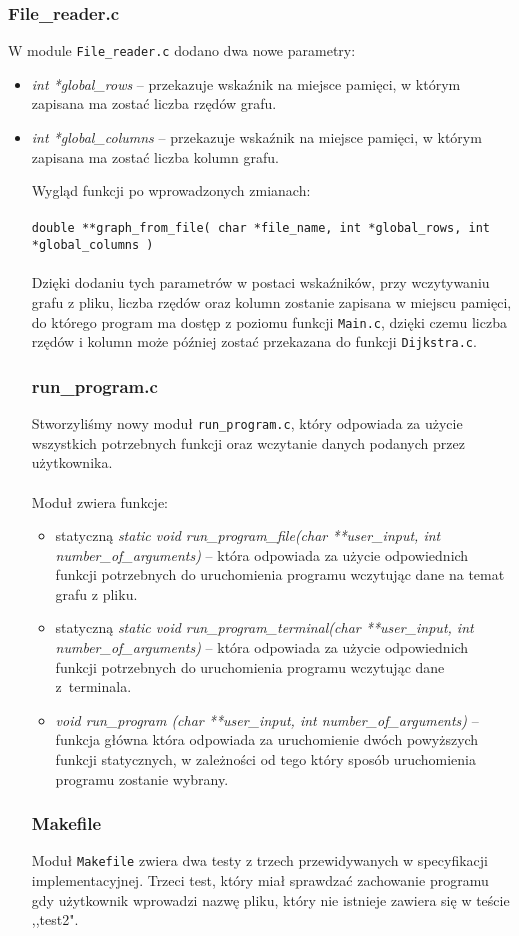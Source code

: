 \documentclass[12pt, a4paper]{article}
\begin{document}
\subsubsection{File\_reader.c}
W module \texttt{File\_reader.c} dodano dwa nowe parametry:
\begin{itemize}

\item \textit{int *global\_rows} -- przekazuje wskaźnik na miejsce pamięci, w którym zapisana ma zostać liczba rzędów grafu.
\item \textit{int *global\_columns} -- przekazuje wskaźnik na miejsce pamięci, w którym zapisana ma zostać liczba kolumn grafu.

Wygląd funkcji po wprowadzonych zmianach:\\\\
\texttt{double **graph\_from\_file( char *file\_name, int *global\_rows, int *global\_columns )}\\\\
Dzięki dodaniu tych parametrów w postaci wskaźników, przy wczytywaniu grafu z pliku, liczba rzędów oraz kolumn zostanie zapisana w miejscu pamięci, do którego program ma dostęp z poziomu funkcji \texttt{Main.c}, dzięki czemu liczba rzędów i kolumn może później zostać przekazana do funkcji \texttt{Dijkstra.c}.

\subsubsection{run\_program.c}
Stworzyliśmy nowy moduł \texttt{run\_program.c}, który odpowiada za użycie wszystkich potrzebnych funkcji oraz wczytanie danych podanych przez użytkownika. \\\\
Moduł zwiera funkcje:
\begin{itemize}
    \item statyczną \textit{static void run\_program\_file(char **user\_input, int number\_of\_arguments)} -- która odpowiada za użycie odpowiednich funkcji potrzebnych do uruchomienia programu wczytując dane na temat grafu z pliku.
    \item statyczną \textit{static void run\_program\_terminal(char **user\_input, int number\_of\_arguments)} -- która odpowiada za użycie odpowiednich funkcji potrzebnych do uruchomienia programu wczytując dane z~terminala.
    \item \textit{void run\_program (char **user\_input, int number\_of\_arguments)} -- funkcja główna która odpowiada za uruchomienie dwóch powyższych funkcji statycznych, w zależności od tego który sposób uruchomienia programu zostanie wybrany.
\end{itemize}

\subsubsection{Makefile}
Moduł \texttt{Makefile} zwiera dwa testy z trzech przewidywanych w specyfikacji implementacyjnej. Trzeci test, który miał sprawdzać zachowanie programu gdy użytkownik wprowadzi nazwę pliku, który nie istnieje zawiera się w teście ,,test2".


\end{itemize}
\end{document}
